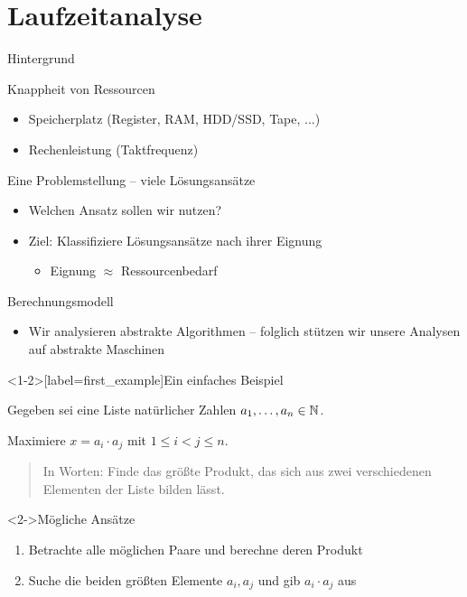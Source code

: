 \section{Laufzeitanalyse}

\begin{frame}{Hintergrund}
\begin{block}{Knappheit von Ressourcen}
    \begin{itemize}
        \item Speicherplatz (Register, RAM, HDD/SSD, Tape, ...)
        \item \alert{Rechenleistung} (Taktfrequenz)
    \end{itemize}
\end{block}
\begin{block}{Eine Problemstellung -- viele Lösungsansätze}
    \begin{itemize}
        \item Welchen Ansatz sollen wir nutzen?
        \item Ziel: Klassifiziere Lösungsansätze nach ihrer \alert{Eignung}
        \begin{itemize}
            \item Eignung $\approx$ Ressourcenbedarf
        \end{itemize}
    \end{itemize}
\end{block}
\begin{block}{Berechnungsmodell}
    \begin{itemize}
        \item Wir analysieren \alert{abstrakte Algorithmen} -- folglich st\"utzen wir unsere Analysen auf \alert{abstrakte Maschinen}
    \end{itemize}
\end{block}
\end{frame}

\begin{frame}<1-2>[label=first_example]{Ein einfaches Beispiel}
\begin{example}
Gegeben sei eine Liste natürlicher Zahlen $a_1, \dots, a_n \in \mathbb{N}$.

Maximiere $x = a_i \cdot a_j$ mit $1 \leq i < j \leq n$.

\begin{quote}
    In Worten: Finde das \alert{gr\"o{\ss}te} Produkt, das sich aus zwei \alert{verschiedenen} Elementen der Liste bilden lässt.
\end{quote}

\begin{block}<2->{M\"ogliche Ans\"atze}
    \begin{enumerate}
        \item Betrachte alle möglichen Paare und berechne deren Produkt
        \pause
        \item<4-> Suche die beiden gr\"o{\ss}ten Elemente $a_i, a_j$ und gib $a_i \cdot a_j$ aus
    \end{enumerate}
\end{block}
\end{example}
\end{frame}

